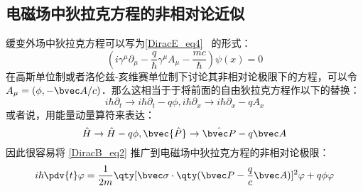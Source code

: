 \subsection{电磁场中狄拉克方程的非相对论近似}
缓变外场中狄拉克方程可以写为\autoref{DiracE_eq4}~ 的形式：
\begin{equation}
(i\gamma^\mu \partial_\mu -\frac{q}{\hbar}\gamma^\mu A_\mu - \frac{mc}{\hbar})\psi(x)=0
\end{equation}
在高斯单位制或者洛伦兹-亥维赛单位制下讨论其非相对论极限下的方程，可以令 $A_\mu=(\phi,-\bvec A/c)$．那么这相当于于将前面的自由狄拉克方程作以下的替换：
\begin{equation}
i\hbar \partial_t \rightarrow i\hbar\partial_t -q\phi, i\hbar\partial_x\rightarrow i\hbar\partial_x - qA_x
\end{equation}
或者说，用能量动量算符来表达：
\begin{equation}
\hat H\rightarrow \hat H-q\phi,\bvec{\hat P}\rightarrow \hat {\bvec P}-q\bvec A
\end{equation}
因此很容易将 \autoref{DiracB_eq2} 推广到电磁场中狄拉克方程的非相对论极限：
\begin{equation}\label{DiracB_eq3}
i\hbar\pdv{t} \varphi = \frac{1}{2m}\qty[\bvec \sigma \cdot\qty(\bvec P - \frac{q}{c}\bvec A)]^2 \varphi + q\phi  \varphi
\end{equation}